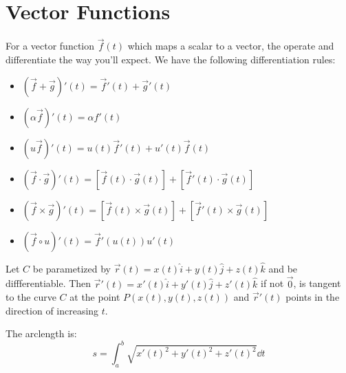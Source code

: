 \documentclass{article}
\begin{document}
    \section{Vector Functions}
    For a vector function $\vec{f}(t)$ which maps a scalar to a vector, the operate and differentiate the way you'll expect. We have the following differentiation rules:
    \begin{itemize}
        \item $(\vec{f}+\vec{g})'(t) = \vec{f}'(t) + \vec{g}'(t)$
        \item $(\alpha\vec{f})'(t) = \alpha f'(t)$
        \item $(u\vec{f})'(t) = u(t)\vec{f}'(t) + u'(t)\vec{f}(t)$
        \item $(\vec{f}\cdot \vec{g})'(t) = \left[\vec{f}(t) \cdot \vec{g}(t)\right] + \left[\vec{f}'(t) \cdot \vec{g}(t)\right]$
        \item $(\vec{f} \times \vec{g})'(t) = \left[\vec{f}(t) \times \vec{g}(t)\right] + \left[\vec{f}'(t) \times \vec{g}(t)\right]$
        \item $(\vec{f}\circ u)'(t) = \vec{f}'(u(t))u'(t)$
    \end{itemize}
    \begin{definition}
        Let $C$ be parametized by $\vec{r}(t) = x(t) \hat{i} + y(t)\hat{j} +z(t)\hat{k}$ and be diffferentiable. Then $\vec{r}'(t)= x'(t)\hat{i}+y'(t)\hat{j}+z'(t)\hat{k}$ if not $\vec{0}$, is tangent to the curve $C$ at the point $P(x(t), y(t), z(t))$ and $\vec{r}'(t)$ points in the direction of increasing $t$.
    \end{definition}
    The arclength is:
        \begin{equation}
            s = \int_a^b\sqrt{x'(t)^2+y'(t)^2+z'(t)^2}\dd{t}
        \end{equation}
\end{document}

